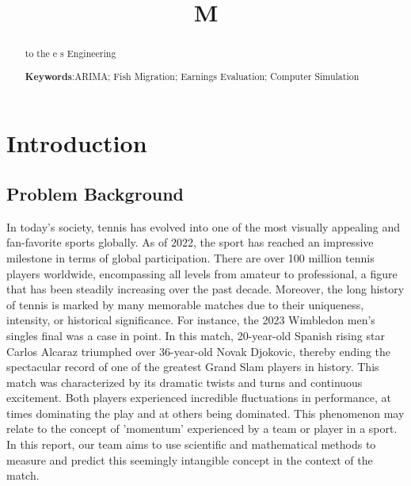 \documentclass[12pt]{article}  %
\title{M}  %
\begin{document}
\begin{abstract}
    
 to the e s Engineering

    \vspace{5pt}  %
    \textbf{Keywords}:ARIMA; Fish Migration; Earnings Evaluation; Computer Simulation

\end{abstract}

\maketitle  %

\tableofcontents  %


\section{Introduction}

\subsection{Problem Background}
In today's society, tennis has evolved into one of the most visually appealing and fan-favorite sports globally. 
As of 2022, the sport has reached an impressive milestone in terms of global participation. 
There are over 100 million tennis players worldwide, encompassing all levels from amateur to professional, 
a figure that has been steadily increasing over the past decade.
Moreover, the long history of tennis is marked by many memorable matches due to their uniqueness, intensity, 
or historical significance. For instance, the 2023 Wimbledon men's singles final was a case in point. 
In this match, 20-year-old Spanish rising star Carlos Alcaraz triumphed over 36-year-old Novak Djokovic, 
thereby ending the spectacular record of one of the greatest Grand Slam players in history. 
This match was characterized by its dramatic twists and turns and continuous excitement. 
Both players experienced incredible fluctuations in performance, at times dominating the play and at others being dominated. 
This phenomenon may relate to the concept of 'momentum' experienced by a team or player in a sport. In this report, 
our team aims to use scientific and mathematical methods to measure and predict this seemingly intangible concept in the context of the match.
\end{document}

